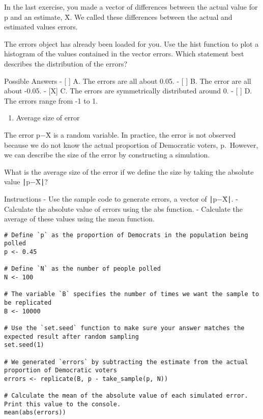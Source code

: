 \documentclass[
]{article}
\providecommand{\tightlist}{%
  \setlength{\itemsep}{0pt}\setlength{\parskip}{0pt}}
\begin{document}
In the last exercise, you made a vector of differences between the
actual value for p and an estimate, X̄. We called these differences
between the actual and estimated values errors.

The errors object has already been loaded for you. Use the hist function
to plot a histogram of the values contained in the vector errors. Which
statement best describes the distribution of the errors?

Possible Answers - {[} {]} A. The errors are all about 0.05. - {[} {]}
B. The error are all about -0.05. - {[}X{]} C. The errors are
symmetrically distributed around 0. - {[} {]} D. The errors range from
-1 to 1.

\begin{enumerate}
\def\labelenumi{\arabic{enumi}.}
\setcounter{enumi}{3}
\tightlist
\item
  Average size of error
\end{enumerate}

The error p−X̄ is a random variable. In practice, the error is not
observed because we do not know the actual proportion of Democratic
voters, p.~However, we can describe the size of the error by
constructing a simulation.

What is the average size of the error if we define the size by taking
the absolute value ∣p−X̄∣?

Instructions - Use the sample code to generate errors, a vector of
∣p−X̄∣. - Calculate the absolute value of errors using the abs function.
- Calculate the average of these values using the mean function.

\begin{verbatim}
# Define `p` as the proportion of Democrats in the population being polled
p <- 0.45

# Define `N` as the number of people polled
N <- 100

# The variable `B` specifies the number of times we want the sample to be replicated
B <- 10000

# Use the `set.seed` function to make sure your answer matches the expected result after random sampling
set.seed(1)

# We generated `errors` by subtracting the estimate from the actual proportion of Democratic voters
errors <- replicate(B, p - take_sample(p, N))

# Calculate the mean of the absolute value of each simulated error. Print this value to the console.
mean(abs(errors))
\end{verbatim}
\end{document}
